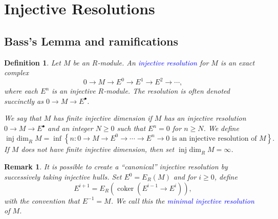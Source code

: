 \documentclass[10pt]{article}
\theoremstyle{thmstyle}
\theoremstyle{defstyle}
\newtheorem{definition}[theorem]{Definition}
\newtheorem{remark}[theorem]{Remark}
\newcommand{\coker}{\operatorname{coker}}
\newcommand{\define}[1]{\textcolor{blue}{\textit{#1}}}
\renewcommand{\ge}{\geqslant}
\newcommand{\injdim}{\operatorname{inj~dim}}
\begin{document}
\section{Injective Resolutions}

\subsection{Bass's Lemma and ramifications}

\begin{definition}
    Let $M$ be an $R$-module. An \define{injective resolution} for $M$ is an exact complex 
    \begin{equation*}
        0\to M\to E^0\to E^1\to E^2\to\cdots,
    \end{equation*}
    where each $E^n$ is an injective $R$-module. The resolution is often denoted succinctly as $0\to M\to E^\bullet$.

    We say that $M$ has finite injective dimension if $M$ has an injective resolution $0\to M\to E^\bullet$ and an integer $N\ge 0$ such that $E^n = 0$ for $n\ge N$. We define 
    \begin{equation*}
        \injdim_R M = \inf\left\{n\colon 0\to M\to E^0\to\cdots\to E^n\to 0\text{ is an injective resolution of } M\right\}.
    \end{equation*}
    If $M$ does not have finite injective dimension, then set $\injdim_R M = \infty$.
\end{definition}

\begin{remark}
    It is possible to create a ``canonical'' injective resolution by successively taking injective hulls. Set $E^0 = E_R(M)$ and for $i\ge 0$, define 
    \begin{equation*}
        E^{i + 1} = E_R\left(\coker\left(E^{i - 1}\to E^i\right)\right),
    \end{equation*}
    with the convention that $E^{-1} = M$. We call this the \define{minimal injective resolution} of $M$.
\end{remark}
\end{document}
